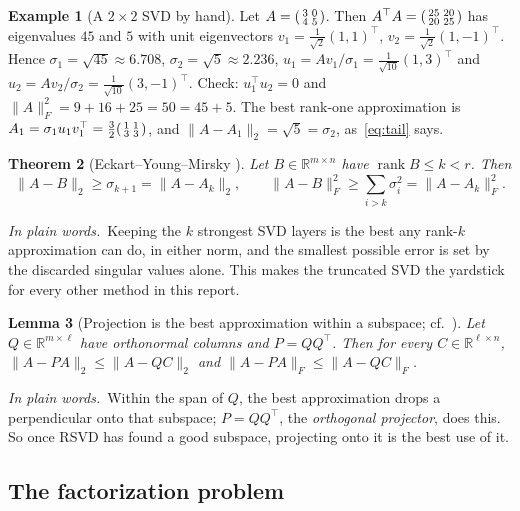 \documentclass[10pt]{article}
\theoremstyle{plain}
\newtheorem{theorem}{Theorem}[section]
\newtheorem{lemma}[theorem]{Lemma}
\theoremstyle{definition}
\newtheorem{example}[theorem]{Example}
\theoremstyle{remark}
\newcommand{\R}{\mathbb{R}}
\newcommand{\T}{^{\top}}
\newcommand{\opn}[1]{\lVert #1\rVert_2}
\newcommand{\fro}[1]{\lVert #1\rVert_F}
\DeclareMathOperator{\rank}{rank}
\newcommand{\plain}{\noindent\emph{In plain words.}\ }
\begin{document}
\begin{example}[A $2\times2$ SVD by hand]\label{ex:svd}
Let $A=\begin{psmallmatrix}3&0\\4&5\end{psmallmatrix}$. Then $A\T A=\begin{psmallmatrix}25&20\\20&25\end{psmallmatrix}$ has eigenvalues $45$ and $5$ with unit eigenvectors $v_1=\tfrac1{\sqrt2}(1,1)\T$, $v_2=\tfrac1{\sqrt2}(1,-1)\T$. Hence $\sigma_1=\sqrt{45}\approx6.708$, $\sigma_2=\sqrt5\approx2.236$, $u_1=Av_1/\sigma_1=\tfrac1{\sqrt{10}}(1,3)\T$ and $u_2=Av_2/\sigma_2=\tfrac1{\sqrt{10}}(3,-1)\T$. Check: $u_1\T u_2=0$ and $\fro A^2=9+16+25=50=45+5$. The best rank-one approximation is $A_1=\sigma_1u_1v_1\T=\tfrac32\begin{psmallmatrix}1&1\\3&3\end{psmallmatrix}$, and $\opn{A-A_1}=\sqrt5=\sigma_2$, as~\eqref{eq:tail} says.
\end{example}

\begin{theorem}[Eckart--Young--Mirsky \cite{eckartyoung1936,mirsky1960}]\label{thm:ey}
Let $B\in\R^{m\times n}$ have $\rank B\le k<r$. Then
\[
\opn{A-B}\ge\sigma_{k+1}=\opn{A-A_k},\qquad
\fro{A-B}^2\ge\sum_{i>k}\sigma_i^2=\fro{A-A_k}^2 .
\]
\end{theorem}

\plain Keeping the $k$ strongest SVD layers is the best any rank-$k$ approximation can do, in either norm, and the smallest possible error is set by the discarded singular values alone. This makes the truncated SVD the yardstick for every other method in this report.

\begin{lemma}[Projection is the best approximation within a subspace; cf.\ \cite{halko2011}]\label{lem:proj}
Let $Q\in\R^{m\times\ell}$ have orthonormal columns and $P=QQ\T$. Then for every $C\in\R^{\ell\times n}$,
$\opn{A-PA}\le\opn{A-QC}$ and $\fro{A-PA}\le\fro{A-QC}$.
\end{lemma}

\plain Within the span of $Q$, the best approximation drops a perpendicular onto that subspace; $P=QQ\T$, the \emph{orthogonal projector}, does this. So once RSVD has found a good subspace, projecting onto it is the best use of it.

\subsection{The factorization problem}
\label{sec:mf}
\end{document}
